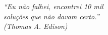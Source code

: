 \begin{epigrafe}
	\vspace*{\fill}
	\begin{flushright}
		\textit{``Eu não falhei, encontrei 10 mil\\
			soluções que não davam certo.'' \\
			(Thomas A. Edison)}
	\end{flushright}
\end{epigrafe}
